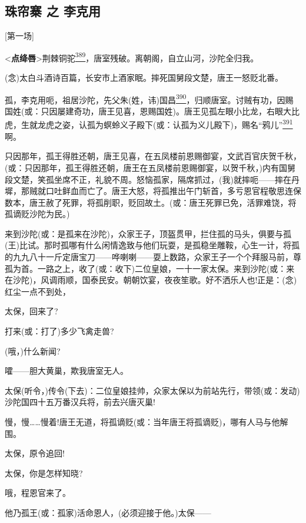 \hypertarget{ux73e0ux5e18ux5be8-ux4e4b-ux674eux514bux7528}{%
\subsection{珠帘寨 之
李克用}\label{ux73e0ux5e18ux5be8-ux4e4b-ux674eux514bux7528}}

{[}第一场{]}

\textless{}\textbf{点绛唇}\textgreater{}荆棘铜驼\protect\hyperlink{fn389}{\textsuperscript{389}}，唐室残破。离朝阁，自立山河，沙陀全归我。

(念)太白斗酒诗百篇，长安市上酒家眠。摔死国舅段文楚，唐王一怒贬北番。

孤，李克用呃，祖居沙陀，先父朱(姓，讳)国昌\protect\hyperlink{fn390}{\textsuperscript{390}}，归顺唐室。讨贼有功，因赐国姓(或：只因屡建奇功，唐王见喜，恩赐国姓)。唐王见孤左眼小比龙，右眼大比虎，生就龙虎之姿，认孤为螟蛉义子殿下(或：认孤为义儿殿下)，赐名``鸦儿''\protect\hyperlink{fn391}{\textsuperscript{391}}啊。

只因那年，孤王得胜还朝，唐王见喜，在五凤楼前恩赐御宴，文武百官庆贺千秋，(或：只因那年，孤王得胜还朝，唐王在五凤楼前恩赐御宴，以贺千秋，)内有国舅段文楚，笑孤坐席不正，礼貌不周。怒恼孤家，隔席抓过，(我)就摔呃------摔在丹墀，那贼就口吐鲜血而亡了。唐王大怒，将孤推出午门斩首，多亏恩官程敬思连保数本，唐王赦了死罪，将孤削职，贬回故土。(或：唐王死罪已免，活罪难饶，将孤谪贬沙陀为民。)

来到沙陀(或：是孤来在沙陀)，众家王子，顶盔贯甲，拦住孤的马头，俱要与孤(王)比试。那时孤哪有什么闲情逸致与他们玩耍，是孤稳坐雕鞍，心生一计，将孤的九九八十一斤定唐宝刀------哗喇喇------耍上数路，众家王子一个个拜服马前，尊孤为首。一路之上，收了(或：收下)二位皇娘，一十一家太保。来到沙陀(或：来在沙陀)，风调雨顺，国泰民安。朝朝饮宴，夜夜笙歌。好不洒乐人也!正是：(念)红尘一点不到处，

太保，回来了?

打来(或：打了)多少飞禽走兽?

(哦，)什么新闻?

嚯------胆大黄巢，欺我唐室无人。

太保(听令，)传令(下去)：二位皇娘挂帅，众家太保以为前站先行，带领(或：发动)沙陀国四十五万番汉兵将，前去兴唐灭巢!

慢，慢\ldots{}\ldots{}慢着!唐王无道，将孤谪贬(或：当年唐王将孤谪贬)，哪有人马与他解围。

太保，原令追回!

太保，你是怎样知晓?

哦，程恩官来了。

他乃孤王(或：孤家)活命恩人，(必须迎接于他。)太保------

